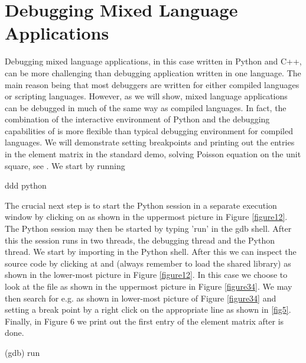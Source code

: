 \section{Debugging Mixed Language Applications}
Debugging mixed language applications, in this case written in
Python and C++, can be more challenging than debugging application
written in one language. The main reason being that most debuggers are written
for either compiled languages or scripting languages. However, as
we will show, mixed language applications can be debugged in much of the same way
as compiled languages. In fact, the combination of the interactive environment
of Python and the debugging capabilities of  is more flexible than typical
debugging environment for compiled languages. We will demonstrate setting breakpoints and
printing out the entries in the element matrix in the standard \dolfin demo,
solving Poisson equation on the unit square, see . We start by running
\begin{c++}
ddd python
\end{c++}
The crucial next step is to start the Python session in a separate execution window by clicking on  as shown in the uppermost picture in  Figure \ref{figure12}.
The Python session may then be started by typing 'run' in the gdb shell.
After this the session runs in two threads, the debugging thread and the
Python thread. We start by importing \dolfin in the Python shell. After this we can inspect the \dolfin source code by clicking at  and  (always remember to load the shared library) as shown in the lower-most picture in Figure \ref{figure12}. In this case we choose to look at the file  as shown in the uppermost picture in Figure \ref{figure34}. We may then search for e.g.  as shown in lower-most picture of Figure \ref{figure34} and
setting a break point by a right click on the appropriate line as shown in \ref{fig5}. Finally, in Figure 6
we print out the first entry of the element matrix after  is done.
\begin{c++}
(gdb) run
\end{c++}
